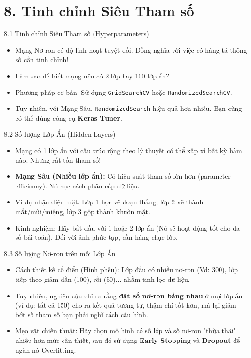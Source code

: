 \documentclass[aspectratio=169, 12pt]{beamer}
\begin{document}
\section{8. Tinh chỉnh Siêu Tham số}

\begin{frame}{8.1 Tinh chỉnh Siêu Tham số (Hyperparameters)}
    \begin{itemize}
        \item Mạng Nơ-ron có độ linh hoạt tuyệt đối. Đồng nghĩa với việc có hàng tá thông số cần tinh chỉnh!
        \item Làm sao để biết mạng nên có 2 lớp hay 100 lớp ẩn?
        \item Phương pháp cơ bản: Sử dụng \texttt{GridSearchCV} hoặc \texttt{RandomizedSearchCV}.
        \item Tuy nhiên, với Mạng Sâu, \texttt{RandomizedSearch} hiệu quả hơn nhiều. Bạn cũng có thể dùng công cụ \textbf{Keras Tuner}.
    \end{itemize}
\end{frame}

\begin{frame}{8.2 Số lượng Lớp Ẩn (Hidden Layers)}
    \begin{itemize}
        \item Mạng có 1 lớp ẩn với cấu trúc rộng theo lý thuyết có thể xấp xỉ bất kỳ hàm nào. Nhưng rất tốn tham số!
        \item \textbf{Mạng Sâu (Nhiều lớp ẩn):} Có hiệu suất tham số lớn hơn (parameter efficiency). Nó học cách phân cấp dữ liệu.
        \item Ví dụ nhận diện mặt: Lớp 1 học vẽ đoạn thẳng, lớp 2 vẽ thành mắt/mũi/miệng, lớp 3 gộp thành khuôn mặt.
        \item Kinh nghiệm: Hãy bắt đầu với 1 hoặc 2 lớp ẩn (Nó sẽ hoạt động tốt cho đa số bài toán). Đối với ảnh phức tạp, cần hàng chục lớp.
    \end{itemize}
\end{frame}

\begin{frame}{8.3 Số lượng Nơ-ron trên mỗi Lớp Ẩn}
    \begin{itemize}
        \item Cách thiết kế cổ điển (Hình phễu): Lớp đầu có nhiều nơ-ron (Vd: 300), lớp tiếp theo giảm dần (100), rồi (50)... nhằm tinh lọc dữ liệu.
        \item Tuy nhiên, nghiên cứu chỉ ra rằng \textbf{đặt số nơ-ron bằng nhau} ở mọi lớp ẩn (ví dụ: tất cả 150) cho ra kết quả tương tự, thậm chí tốt hơn, mà lại giảm bớt số tham số bạn phải nghĩ cách cấu hình.
        \item Mẹo vặt chiến thuật: Hãy chọn mô hình có số lớp và số nơ-ron "thừa thãi" nhiều hơn mức cần thiết, sau đó sử dụng \textbf{Early Stopping} và \textbf{Dropout} để ngăn nó Overfitting.
    \end{itemize}
\end{frame}
\end{document}
